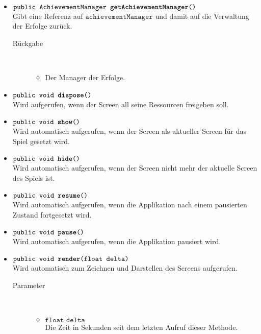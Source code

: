 \begin{description}
\begin{itemize}
		\item $\texttt{public AchievementManager \textbf{getAchievementManager}()}$ \\ Gibt eine Referenz auf $\texttt{achievementManager}$ und damit auf die Verwaltung der Erfolge zurück.
		\begin{description}
			\item[Rückgabe] \hfill \\
			\vspace{-.8cm}
			\begin{itemize}
				\item Der Manager der Erfolge.
			\end{itemize}
		\end{description}	
		
		\item $\texttt{public void \textbf{dispose}()}$ \\ Wird aufgerufen, wenn der Screen all seine Ressourcen freigeben soll.
		
		\item $\texttt{public void \textbf{show}()}$ \\ Wird automatisch aufgerufen, wenn der Screen als aktueller Screen für das Spiel gesetzt wird.
	
		\item $\texttt{public void \textbf{hide}()}$ \\ Wird automatisch aufgerufen, wenn der Screen nicht mehr der aktuelle Screen des Spiels ist.
	
		\item $\texttt{public void \textbf{resume}()}$ \\ Wird automatisch aufgerufen, wenn die Applikation nach einem pausierten Zustand fortgesetzt wird.	
	
		\item $\texttt{public void \textbf{pause}()}$ \\ Wird automatisch aufgerufen, wenn die Applikation pausiert wird.
	
		\item $\texttt{public void \textbf{render}(float delta)}$ \\ Wird automatisch zum Zeichnen und Darstellen des Screens aufgerufen.
		\begin{description}
			\item[Parameter] \hfill \\
			\vspace{-.8cm}
			\begin{itemize}
				\item $\texttt{float delta}$ \\ Die Zeit in Sekunden seit dem letzten Aufruf dieser Methode.
			\end{itemize}
		\end{description}	
	

\end{itemize}
\end{description}
